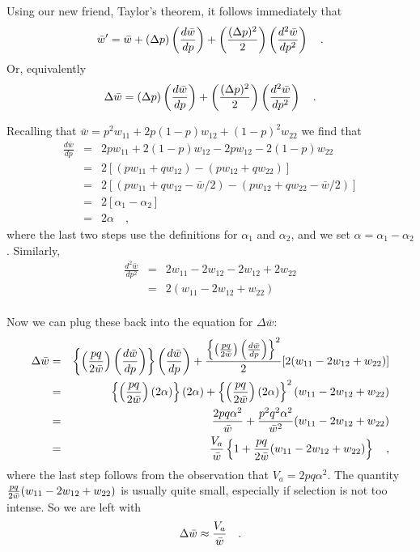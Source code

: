 \documentclass[12pt]{article}
\begin{document}
Using our new friend, Taylor's theorem, it follows immediately that
\[
{\bar w}' = {\bar w} + \left(\Delta p\right)\left({{d{\bar w}} \over {dp}}\right)
            + \left({{(\Delta p)^2} \over 2}\right)
              \left({{d^2{\bar w}} \over {dp^2}}\right) \quad .
\]
Or, equivalently
\[
\Delta {\bar w} = \left(\Delta p\right)\left({{d{\bar w}} \over {dp}}\right)
            + \left({{(\Delta p)^2} \over 2}\right)
              \left({{d^2{\bar w}} \over {dp^2}}\right) \quad .
\]

Recalling that ${\bar w} = p^2w_{11} + 2p(1-p)w_{12} + (1-p)^2w_{22}$
we find that
\begin{eqnarray*}
\frac{d{\bar w}}{dp}
 &=& 2pw_{11} + 2(1-p)w_{12} - 2pw_{12} - 2(1-p)w_{22} \\
 &=& 2[(pw_{11}+qw_{12}) - (pw_{12}+qw_{22})] \\
 &=& 2[(pw_{11}+qw_{12}-{\bar w}/2) - (pw_{12}+qw_{22}-{\bar w}/2)] \\
 &=& 2[\alpha_1 - \alpha_2] \\
 &=& 2\alpha \quad ,
\end{eqnarray*}
where the last two steps use the definitions for $\alpha_1$ and
$\alpha_2$, and we set $\alpha = \alpha_1 - \alpha_2$.  Similarly,
\begin{eqnarray*}
\frac{d^2{\bar w}}{dp^2}
 &=& 2w_{11} - 2w_{12} - 2w_{12} + 2w_{22} \\
 &=& 2(w_{11} - 2w_{12} + w_{22}) \\
\end{eqnarray*}

Now we can plug these back into the equation for $\Delta\bar w$:
\begin{eqnarray*}
\Delta {\bar w}
 &=& \left\{\left({{pq} \over {2{\bar w}}}\right)\left({{d{\bar w}} \over {dp}}\right)
      \right\}
    \left({{d{\bar w}} \over {dp}}\right)
    + {{ \left\{\left({{pq} \over {2{\bar w}}}\right)\left({{d{\bar w}} \over {dp}}\right)
      \right\}^2} \over 2}
    [2(w_{11} - 2w_{12} + w_{22})] \\
 &=& \left\{\left({{pq} \over {2{\bar w}}}\right)\left(2\alpha\right)\right\}\left(2\alpha\right)
    + \left\{\left({{pq} \over {2{\bar w}}}\right)\left(2\alpha\right)\right\}^2
    (w_{11} - 2w_{12} + w_{22}) \\
 &=& {{2pq\alpha^2} \over {\bar w}}
    + {{p^2q^2\alpha^2} \over {{\bar w}^2}}(w_{11} - 2w_{12} + w_{22}) \\
 &=& {V_a \over {\bar w}}
    \left\{1 + {{pq} \over {2{\bar w}}}(w_{11} - 2w_{12} + w_{22})\right\} 
    \quad , 
\end{eqnarray*}
where the last step follows from the observation that $V_a =
2pq\alpha^2$.  The quantity ${{pq} \over {2{\bar w}}}(w_{11} - 2w_{12}
+ w_{22})$ is usually quite small, especially if selection is not too
intense.  So we are left with
\[
\Delta {\bar w} \approx {V_a \over {\bar w}} \quad .
\]




\ccLicense
\end{document}
